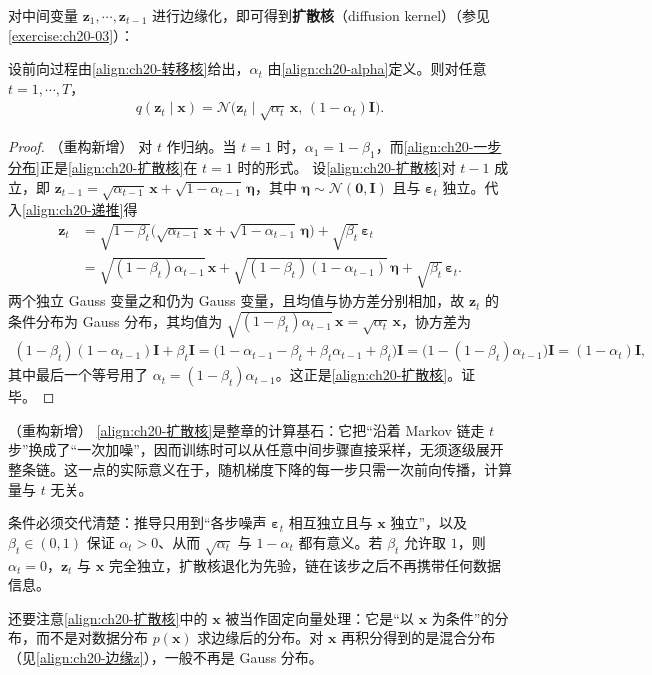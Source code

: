\documentclass[../../main.tex]{subfiles}
\begin{document}
对中间变量 $\bm{z}_1,\cdots,\bm{z}_{t-1}$ 进行边缘化，即可得到\textbf{扩散核}（diffusion kernel）（参见\cref{exercise:ch20-03}）：

\begin{proposition}[扩散核的闭式边缘分布]\label{proposition:ch20-扩散核}
设前向过程由\eqref{align:ch20-转移核}给出，$\alpha_t$ 由\eqref{align:ch20-alpha}定义。则对任意 $t=1,\cdots,T$，
\begin{align}
q(\bm{z}_t\mid\bm{x})=\mathcal{N}\big(\bm{z}_t\mid\sqrt{\alpha_t}\,\bm{x},\,(1-\alpha_t)\bm{I}\big).
\label{align:ch20-扩散核}
\end{align}
\end{proposition}

\begin{proof}（重构新增）
对 $t$ 作归纳。当 $t=1$ 时，$\alpha_1=1-\beta_1$，而\eqref{align:ch20-一步分布}正是\eqref{align:ch20-扩散核}在 $t=1$ 时的形式。
设\eqref{align:ch20-扩散核}对 $t-1$ 成立，即 $\bm{z}_{t-1}=\sqrt{\alpha_{t-1}}\,\bm{x}+\sqrt{1-\alpha_{t-1}}\,\bm{\eta}$，其中 $\bm{\eta}\sim\mathcal{N}(\bm{0},\bm{I})$ 且与 $\bm{\varepsilon}_t$ 独立。代入\eqref{align:ch20-递推}得
\begin{align*}
\bm{z}_t&=\sqrt{1-\beta_t}\Big(\sqrt{\alpha_{t-1}}\,\bm{x}+\sqrt{1-\alpha_{t-1}}\,\bm{\eta}\Big)+\sqrt{\beta_t}\,\bm{\varepsilon}_t\\
&=\sqrt{(1-\beta_t)\alpha_{t-1}}\,\bm{x}+\sqrt{(1-\beta_t)(1-\alpha_{t-1})}\,\bm{\eta}+\sqrt{\beta_t}\,\bm{\varepsilon}_t.
\end{align*}
两个独立 Gauss 变量之和仍为 Gauss 变量，且均值与协方差分别相加，故 $\bm{z}_t$ 的条件分布为 Gauss 分布，其均值为 $\sqrt{(1-\beta_t)\alpha_{t-1}}\,\bm{x}=\sqrt{\alpha_t}\,\bm{x}$，协方差为
\begin{align*}
(1-\beta_t)(1-\alpha_{t-1})\bm{I}+\beta_t\bm{I}=\big(1-\alpha_{t-1}-\beta_t+\beta_t\alpha_{t-1}+\beta_t\big)\bm{I}=\big(1-(1-\beta_t)\alpha_{t-1}\big)\bm{I}=(1-\alpha_t)\bm{I},
\end{align*}
其中最后一个等号用了 $\alpha_t=(1-\beta_t)\alpha_{t-1}$。这正是\eqref{align:ch20-扩散核}。证毕。
\end{proof}

\begin{remark}（重构新增）
\eqref{align:ch20-扩散核}是整章的计算基石：它把“沿着 Markov 链走 $t$ 步”换成了“一次加噪”，因而训练时可以从任意中间步骤直接采样，无须逐级展开整条链。这一点的实际意义在于，随机梯度下降的每一步只需一次前向传播，计算量与 $t$ 无关。\par
条件必须交代清楚：推导只用到“各步噪声 $\bm{\varepsilon}_t$ 相互独立且与 $\bm{x}$ 独立”，以及 $\beta_t\in(0,1)$ 保证 $\alpha_t>0$、从而 $\sqrt{\alpha_t}$ 与 $1-\alpha_t$ 都有意义。若 $\beta_t$ 允许取 $1$，则 $\alpha_t=0$，$\bm{z}_t$ 与 $\bm{x}$ 完全独立，扩散核退化为先验，链在该步之后不再携带任何数据信息。\par
还要注意\eqref{align:ch20-扩散核}中的 $\bm{x}$ 被当作固定向量处理：它是“以 $\bm{x}$ 为条件”的分布，而不是对数据分布 $p(\bm{x})$ 求边缘后的分布。对 $\bm{x}$ 再积分得到的是混合分布（见\eqref{align:ch20-边缘z}），一般不再是 Gauss 分布。
\end{remark}
\end{document}
